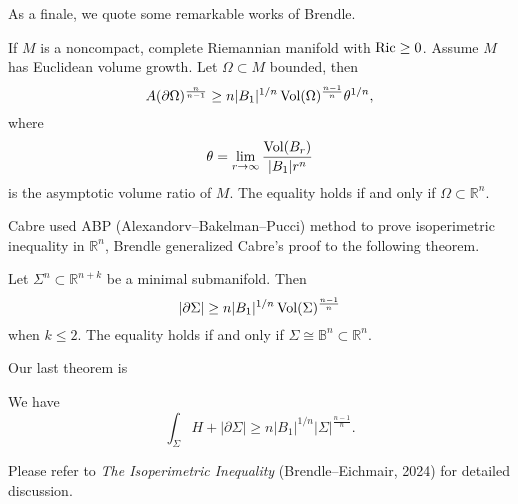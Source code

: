 As a finale, we quote some remarkable works of Brendle.

\begin{thm}[Brendle]
    If $M$ is a noncompact, complete Riemannian manifold with $\operatorname{Ric}\geq 0$.
    Assume $M$ has Euclidean volume growth.
    Let $\Omega\subset M$ bounded, then
    \[A(\partial\Omega)^{\frac{n}{n-1}}\geq n|B_1|^{1/n}\operatorname{Vol}(\Omega)^{\frac{n-1}{n}}\theta^{1/n},\]
    where
    \[\theta=\lim_{r\to\infty}\frac{\operatorname{Vol}(B_r)}{|B_1|r^n}\]
    is the asymptotic volume ratio of $M$.
    The equality holds if and only if $\Omega\subset\mathbb{R}^n$.
\end{thm}

Cabre used ABP (Alexandorv--Bakelman--Pucci) method to prove isoperimetric inequality in $\mathbb{R}^n$, Brendle generalized Cabre's proof to the following theorem.

\begin{thm}[Brendle]
    Let $\Sigma^n\subset\mathbb{R}^{n+k}$ be a minimal submanifold.
    Then
    \[|\partial\Sigma|\geq n|B_1|^{1/n}\operatorname{Vol}(\Sigma)^{\frac{n-1}{n}}\]
    when $k\leq 2$.
    The equality holds if and only if $\Sigma\cong\mathbb{B}^n\subset\mathbb{R}^n$.
\end{thm}

Our last theorem is

\begin{thm}[Brendle]
    We have
    \[\int_\Sigma H+|\partial\Sigma|\geq n|B_1|^{1/n}|\Sigma|^\frac{n-1}{n}.\]
\end{thm}

Please refer to \emph{The Isoperimetric Inequality} (Brendle--Eichmair, 2024) for detailed discussion.